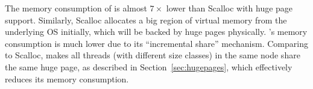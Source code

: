 The memory consumption of \NM{} is almost $7\times$ lower than Scalloc with huge page support. Similarly, Scalloc allocates a big region of virtual memory from the underlying OS initially, which will be backed by huge pages physically. \NM{}'s memory consumption is much lower due to its ``incremental share'' mechanism. Comparing to Scalloc, \NM{} makes all threads (with different size classes) in the same node share the same huge page, as described in Section~\ref{sec:hugepages}, which effectively reduces its memory consumption. 


 
 
